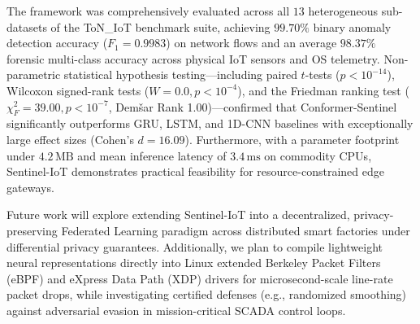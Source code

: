 \documentclass[11pt,a4paper]{article}
\begin{document}
The framework was comprehensively evaluated across all $13$ heterogeneous sub-datasets of the ToN\_IoT benchmark suite, achieving $99.70\%$ binary anomaly detection accuracy ($F_1 = 0.9983$) on network flows and an average $98.37\%$ forensic multi-class accuracy across physical IoT sensors and OS telemetry. Non-parametric statistical hypothesis testing—including paired $t$-tests ($p < 10^{-14}$), Wilcoxon signed-rank tests ($W=0.0, p < 10^{-4}$), and the Friedman ranking test ($\chi_F^2 = 39.00, p < 10^{-7}$, Demšar Rank 1.00)—confirmed that Conformer-Sentinel significantly outperforms GRU, LSTM, and 1D-CNN baselines with exceptionally large effect sizes (Cohen's $d = 16.09$). Furthermore, with a parameter footprint under $4.2\,\text{MB}$ and mean inference latency of $3.4\,\text{ms}$ on commodity CPUs, Sentinel-IoT demonstrates practical feasibility for resource-constrained edge gateways.

Future work will explore extending Sentinel-IoT into a decentralized, privacy-preserving Federated Learning paradigm across distributed smart factories under differential privacy guarantees. Additionally, we plan to compile lightweight neural representations directly into Linux extended Berkeley Packet Filters (eBPF) and eXpress Data Path (XDP) drivers for microsecond-scale line-rate packet drops, while investigating certified defenses (e.g., randomized smoothing) against adversarial evasion in mission-critical SCADA control loops.

\clearpage



\end{document}
